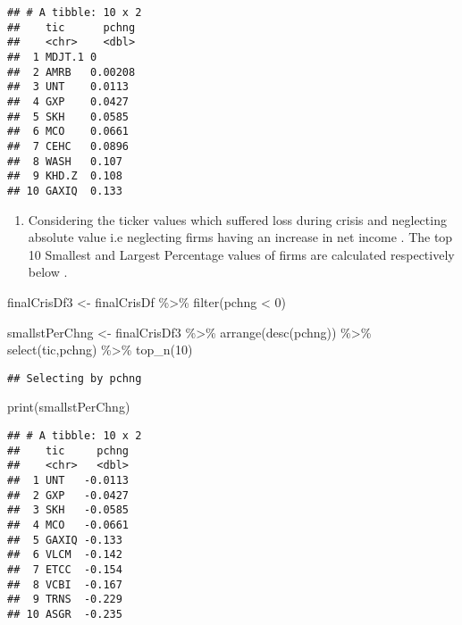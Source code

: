 \documentclass[
]{article}
\newenvironment{Shaded}{\begin{snugshade}}{\end{snugshade}}
\newcommand{\DecValTok}[1]{\textcolor[rgb]{0.00,0.00,0.81}{#1}}
\newcommand{\FunctionTok}[1]{\textcolor[rgb]{0.00,0.00,0.00}{#1}}
\newcommand{\NormalTok}[1]{#1}
\newcommand{\OtherTok}[1]{\textcolor[rgb]{0.56,0.35,0.01}{#1}}
\newcommand{\SpecialCharTok}[1]{\textcolor[rgb]{0.00,0.00,0.00}{#1}}
\providecommand{\tightlist}{%
  \setlength{\itemsep}{0pt}\setlength{\parskip}{0pt}}
\begin{document}
\begin{verbatim}
## # A tibble: 10 x 2
##    tic      pchng
##    <chr>    <dbl>
##  1 MDJT.1 0      
##  2 AMRB   0.00208
##  3 UNT    0.0113 
##  4 GXP    0.0427 
##  5 SKH    0.0585 
##  6 MCO    0.0661 
##  7 CEHC   0.0896 
##  8 WASH   0.107  
##  9 KHD.Z  0.108  
## 10 GAXIQ  0.133
\end{verbatim}

\begin{enumerate}
\def\labelenumi{\alph{enumi})}
\setcounter{enumi}{1}
\tightlist
\item
  Considering the ticker values which suffered loss during crisis and
  neglecting absolute value i.e neglecting firms having an increase in
  net income . The top 10 Smallest and Largest Percentage values of
  firms are calculated respectively below .
\end{enumerate}

\begin{Shaded}
\begin{Highlighting}[]
\NormalTok{finalCrisDf3 }\OtherTok{\textless{}{-}}\NormalTok{ finalCrisDf }\SpecialCharTok{\%\textgreater{}\%} \FunctionTok{filter}\NormalTok{(pchng }\SpecialCharTok{\textless{}} \DecValTok{0}\NormalTok{)}

\NormalTok{smallstPerChng }\OtherTok{\textless{}{-}}\NormalTok{ finalCrisDf3 }\SpecialCharTok{\%\textgreater{}\%} \FunctionTok{arrange}\NormalTok{(}\FunctionTok{desc}\NormalTok{(pchng)) }\SpecialCharTok{\%\textgreater{}\%} \FunctionTok{select}\NormalTok{(tic,pchng) }\SpecialCharTok{\%\textgreater{}\%} \FunctionTok{top\_n}\NormalTok{(}\DecValTok{10}\NormalTok{)}
\end{Highlighting}
\end{Shaded}

\begin{verbatim}
## Selecting by pchng
\end{verbatim}

\begin{Shaded}
\begin{Highlighting}[]
\FunctionTok{print}\NormalTok{(smallstPerChng)}
\end{Highlighting}
\end{Shaded}

\begin{verbatim}
## # A tibble: 10 x 2
##    tic     pchng
##    <chr>   <dbl>
##  1 UNT   -0.0113
##  2 GXP   -0.0427
##  3 SKH   -0.0585
##  4 MCO   -0.0661
##  5 GAXIQ -0.133 
##  6 VLCM  -0.142 
##  7 ETCC  -0.154 
##  8 VCBI  -0.167 
##  9 TRNS  -0.229 
## 10 ASGR  -0.235
\end{verbatim}
\end{document}
